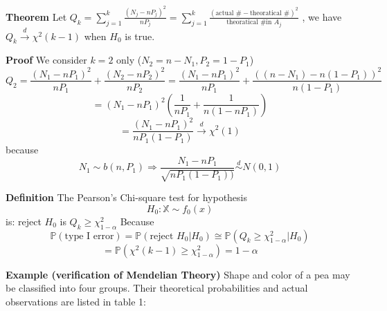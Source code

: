 \documentclass[a4paper,12pt]{article}
\begin{document}
\textbf{Theorem} Let $Q_k = \sum_{j=1}^k \frac{(N_j - nP_j)^2}{nP_j} = \sum_{j=1}^k \frac{(\text{actual \#} - \text{theoratical \#})^2}{\text{theoratical \# in }A_j}$
, we have $Q_k \overset{d}{\to} \chi^2(k-1)$ when $H_0$ is true.

\textbf{Proof} We consider $k = 2$ only ($N_2 = n - N_1, P_2 = 1- P_1$)
$$Q_2 = \frac{(N_1 - nP_1)^2}{nP_1} + \frac{(N_2 - nP_2)^2}{nP_2} = \frac{(N_1 - nP_1)^2}{nP_1} + \frac{((n-N_1) - n(1-P_1))^2}{n(1-P_1)}$$
$$= (N_1 - nP_1)^2 (\frac{1}{nP_1} + \frac{1}{n(1-nP_1)})$$
$$= \frac{(N_1 - nP_1)^2}{nP_1(1-P_1)} \overset{d}{\to} \chi^2(1) $$
because $$N_1 \sim b(n, P_1) \Rightarrow \frac{N_1 - nP_1}{\sqrt{nP_1(1-P_1))}} \overset{d}{\sim} N(0, 1)$$

\textbf{Definition} The Pearson's Chi-square test for hypothesis
$$H_0: \mathbb{X} \sim f_0(x)$$
is: reject $H_0$ is $Q_k \geq \chi^2_{1-\alpha}$ 
Because $$\mathbb{P}(\text{type I error}) = \mathbb{P}(\text{reject }H_0 | H_0) \cong \mathbb{P}(Q_k \geq \chi^2_{1-\alpha} | H_0)$$
$$= \mathbb{P} (\chi^2(k-1) \geq \chi^2_{1-\alpha}) = 1-\alpha$$

\textbf{Example (verification of Mendelian Theory)} Shape and color of a pea may be classified into four groups. Their theoretical probabilities and actual observations are listed in table 1:
\end{document}
